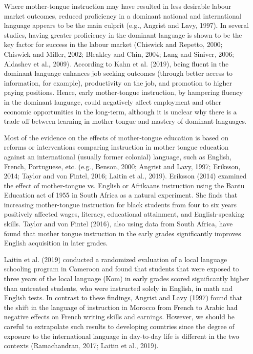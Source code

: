 Where mother-tongue instruction may have resulted in less desirable labour market outcomes, reduced proficiency in a dominant national and international language appears to be the main culprit (e.g., Angrist and Lavy, 1997). In several studies, having greater proficiency in the dominant language is shown to be the key factor for success in the labour market (Chiswick and Repetto, 2000; Chiswick and Miller, 2002; Bleakley and Chin, 2004; Lang and Siniver, 2006; Aldashev et al., 2009). According to Kahn et al. (2019), being fluent in the dominant language enhances job seeking outcomes (through better access to information, for example), productivity on the job, and promotion to higher paying positions. Hence, early mother-tongue instruction, by hampering fluency in the dominant language, could negatively affect employment and other economic opportunities in the long-term, although it is unclear why there is a trade-off between learning in mother tongue and mastery of dominant languages. 

Most of the evidence on the effects of mother-tongue education is based on reforms or interventions comparing instruction in mother tongue education against an international (usually former colonial) language, such as English, French, Portuguese, etc. (e.g., Benson, 2000; Angrist and Lavy, 1997; Eriksson, 2014; Taylor and von Fintel, 2016; Laitin et al., 2019). Eriksson (2014) examined the effect of mother-tongue vs. English or Afrikaans instruction using the Bantu Education act of 1955 in South Africa as a natural experiment. She finds that increasing mother-tongue instruction for black students from four to six years positively affected wages, literacy, educational attainment, and English-speaking skills. Taylor and von Fintel (2016), also using data from South Africa, have found that mother tongue instruction in the early grades significantly improves English acquisition in later grades. 

Laitin et al. (2019) conducted a randomized evaluation of a local language schooling program in Cameroon and found that students that were exposed to three years of the local language (Kom) in early grades scored significantly higher than untreated students, who were instructed solely in English, in math and English tests. In contrast to these findings, Angrist and Lavy (1997) found that the shift in the language of instruction in Morocco from French to Arabic had negative effects on French writing skills and earnings. However, we should be careful to extrapolate such results to developing countries since the degree of exposure to the international language in day-to-day life is different in the two contexts (Ramachandran, 2017; Laitin et al., 2019).

